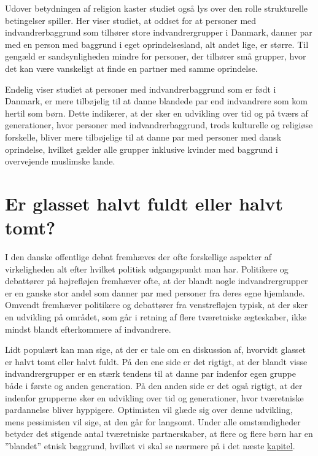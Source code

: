 \documentclass[
]{book}
\begin{document}
Udover betydningen af religion kaster studiet også lys over den rolle strukturelle betingelser spiller. Her viser studiet, at oddset for at personer med indvandrerbaggrund som tilhører store indvandrergrupper i Danmark, danner par med en person med baggrund i eget oprindelsesland, alt andet lige, er større. Til gengæld er sandsynligheden mindre for personer, der tilhører små grupper, hvor det kan være vanskeligt at finde en partner med samme oprindelse.

Endelig viser studiet at personer med indvandrerbaggrund som er født i Danmark, er mere tilbøjelig til at danne blandede par end indvandrere som kom hertil som børn. Dette indikerer, at der sker en udvikling over tid og på tværs af generationer, hvor personer med indvandrerbaggrund, trods kulturelle og religiøse forskelle, bliver mere tilbøjelige til at danne par med personer med dansk oprindelse, hvilket gælder alle grupper inklusive kvinder med baggrund i overvejende muslimske lande.

\section{Er glasset halvt fuldt eller halvt tomt?}\label{er-glasset-halvt-fuldt-eller-halvt-tomt}

I den danske offentlige debat fremhæves der ofte forskellige aspekter af virkeligheden alt efter hvilket politisk udgangspunkt man har. Politikere og debattører på højrefløjen fremhæver ofte, at der blandt nogle indvandrergrupper er en ganske stor andel som danner par med personer fra deres egne hjemlande. Omvendt fremhæver politikere og debattører fra venstrefløjen typisk, at der sker en udvikling på området, som går i retning af flere tværetniske ægteskaber, ikke mindst blandt efterkommere af indvandrere.

Lidt populært kan man sige, at der er tale om en diskussion af, hvorvidt glasset er halvt tomt eller halvt fuldt. På den ene side er det rigtigt, at der blandt visse indvandrergrupper er en stærk tendens til at danne par indenfor egen gruppe både i første og anden generation. På den anden side er det også rigtigt, at der indenfor grupperne sker en udvikling over tid og generationer, hvor tværetniske pardannelse bliver hyppigere. Optimisten vil glæde sig over denne udvikling, mens pessimisten vil sige, at den går for langsomt. Under alle omstændigheder betyder det stigende antal tværetniske partnerskaber, at flere og flere børn har en ''blandet'' etnisk baggrund, hvilket vi skal se nærmere på i det næste \hyperref[kap3]{kapitel}.
\end{document}
